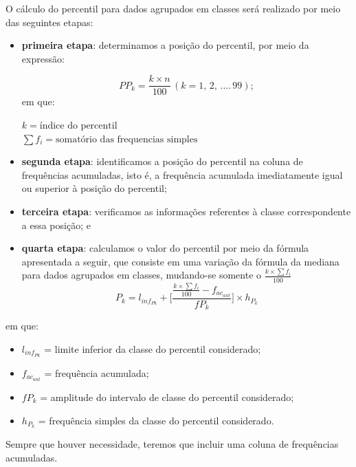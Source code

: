 O cálculo do percentil para dados agrupados em classes será realizado por meio das seguintes etapas:

\begin{itemize}
    \item \textbf{primeira etapa}: determinamos a posição do percentil, por meio da expressão:

\[
    P{P_k}=\frac{k\times n}{100}\, (k= 1,\,2,\,\dots.\,99);
\]
em que:

    \(k=\text{índice do percentil}\)\\
    \(\sum f_i=\text{somatório das frequencias simples}\)

    \item \textbf{segunda etapa}: identificamos a posição do percentil na coluna de frequências acumuladas, isto é, a
frequência acumulada imediatamente igual ou superior à posição do percentil;
    \item \textbf{terceira etapa}: verificamos as informações referentes à classe correspondente a essa posição; e
    \item \textbf{quarta etapa}: calculamos o valor do percentil por meio da fórmula apresentada a seguir, que consiste
em uma variação da fórmula da mediana para dados agrupados em classes, mudando-se somente o \(\frac{k\times \sum f_i}{100}\)
\[
    P_k=l_{inf_{Pk}}+
    \Bigg[
    \frac{\frac{k\times \sum f_i}{100}-f_{ac_{ant}}}{f{P_k}}
    \Bigg]
    \times h_{P_k}
\]
\end{itemize}

em que:
\begin{itemize}
    \item \(l_{inf_{Pk}}\) = limite inferior da classe do percentil considerado;
    \item \(f_{ac_{ant}}\) = frequência acumulada;
    \item \(f{P_k}\) = amplitude do intervalo de classe do percentil considerado;
    \item \(h_{P_k}\) = frequência simples da classe do percentil considerado. 
\end{itemize}

Sempre que houver necessidade, teremos que incluir uma coluna de frequências acumuladas.
